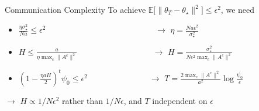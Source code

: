 \documentclass[aspectratio=169,14pt]{beamer}
\begin{document}
\begin{frame}{Communication Complexity}
  To achieve $\mathbb{E} \Big[ \| {\theta_T - \theta_\star} \|^2 \Big] \le \epsilon^2$, we need
  \begin{itemize}
  \item $\frac{\eta \sigma_\star^2}{N a} \le \epsilon^2$ ~~~~~~\,~~~~~~~~~~~~~~~~~~~ $\rightarrow$ $\eta = \frac{N a \epsilon^2}{\sigma_\star^2}$
  \item $H \le \frac{a}{\eta \max_c \| A^c \|^2}$ ~~~~~~~~~~~~~~~~~ $\rightarrow$ $H = \frac{ \sigma_\star^2 }{N \epsilon^2 \max_c \| A^c \|^2}$
  \item $(1 - \frac{\eta a H}{2})^{t} \psi_0 \le \epsilon^2$ ~~~~~~~~~~~~\,~~$\rightarrow$ $T = \frac{2 \max_c \| A^c \|^2}{a^2} \log \tfrac{\psi_0}{ \epsilon }$
  \end{itemize}

  $\rightarrow$ $H \propto 1/N\epsilon^2$ rather than $1/N\epsilon$, and $T$ independent on $\epsilon$


\end{frame}



\end{document}
